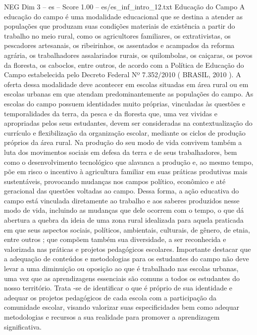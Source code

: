 \begin{textsample}{NEG Dim 3 – es – Score 1.00 – es/es\_inf\_intro\_12.txt}  \label{ex:f3_neg_180}
Educação do Campo A educação do campo é uma modalidade educacional que se destina a atender as populações que produzam suas condições materiais de existência a partir do trabalho no meio rural, como os agricultores familiares, os extrativistas, os pescadores artesanais, os ribeirinhos, os assentados e acampados da reforma agrária, os trabalhadores assalariados rurais, os quilombolas, os caiçaras, os povos da floresta, os caboclos, entre outros, de acordo com a Política de Educação do Campo estabelecida pelo Decreto Federal Nº 7.352/2010 ( BRASIL, 2010 ).
A oferta dessa modalidade deve acontecer em escolas situadas em área rural ou em escolas urbanas em que atendam predominantemente as populações do campo.
As escolas do campo possuem identidades muito próprias, vinculadas às questões e temporalidades da terra, da pesca e da floresta que, uma vez vividas e apropriadas pelos seus estudantes, devem ser consideradas na contextualização do currículo e flexibilização da organização escolar, mediante os ciclos de produção próprios da área rural.
Na produção do seu modo de vida convivem também a luta dos movimentos sociais em defesa da terra e de seus trabalhadores, bem como o desenvolvimento tecnológico que alavanca a produção e, ao mesmo tempo, põe em risco o incentivo à agricultura familiar em suas práticas produtivas mais sustentáveis, provocando mudanças nos campos político, econômico e até geracional das questões voltadas ao campo.
Dessa forma, a ação educativa do campo está vinculada diretamente ao trabalho e aos saberes produzidos nesse modo de vida, incluindo as mudanças que dele ocorrem com o tempo, o que dá abertura a quebra da ideia de uma zona rural idealizada para aquela praticada em que seus aspectos sociais, políticos, ambientais, culturais, de gênero, de etnia, entre outros ; que compõem também sua diversidade, a ser reconhecida e valorizada nas práticas e projetos pedagógicos escolares.
Importante destacar que a adequação de conteúdos e metodologias para os estudantes do campo não deve levar a uma diminuição ou oposição ao que é trabalhado nas escolas urbanas, uma vez que as aprendizagens essenciais são comuns a todos os estudantes do nosso território.
Trata -se de identificar o que é próprio de sua identidade e adequar os projetos pedagógicos de cada escola com a participação da comunidade escolar, visando valorizar suas especificidades bem como adequar metodologias e recursos a sua realidade para promover a aprendizagem significativa.

\end{textsample}
